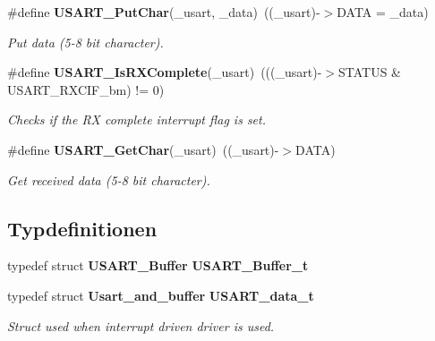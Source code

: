 \begin{DoxyCompactItemize}
\#define {\bf USART\_\-PutChar}(\_\-usart, \_\-data)~((\_\-usart)-\/$>$DATA = \_\-data)
\begin{DoxyCompactList}\small\item\em Put data (5-\/8 bit character). \item\end{DoxyCompactList}\item 
\#define {\bf USART\_\-IsRXComplete}(\_\-usart)~(((\_\-usart)-\/$>$STATUS \& USART\_\-RXCIF\_\-bm) != 0)
\begin{DoxyCompactList}\small\item\em Checks if the RX complete interrupt flag is set. \item\end{DoxyCompactList}\item 
\#define {\bf USART\_\-GetChar}(\_\-usart)~((\_\-usart)-\/$>$DATA)
\begin{DoxyCompactList}\small\item\em Get received data (5-\/8 bit character). \item\end{DoxyCompactList}\end{DoxyCompactItemize}
\subsection*{Typdefinitionen}
\begin{DoxyCompactItemize}
\item 
typedef struct {\bf USART\_\-Buffer} {\bf USART\_\-Buffer\_\-t}
\item 
typedef struct {\bf Usart\_\-and\_\-buffer} {\bf USART\_\-data\_\-t}
\begin{DoxyCompactList}\small\item\em Struct used when interrupt driven driver is used. \item\end{DoxyCompactList}\end{DoxyCompactItemize}
